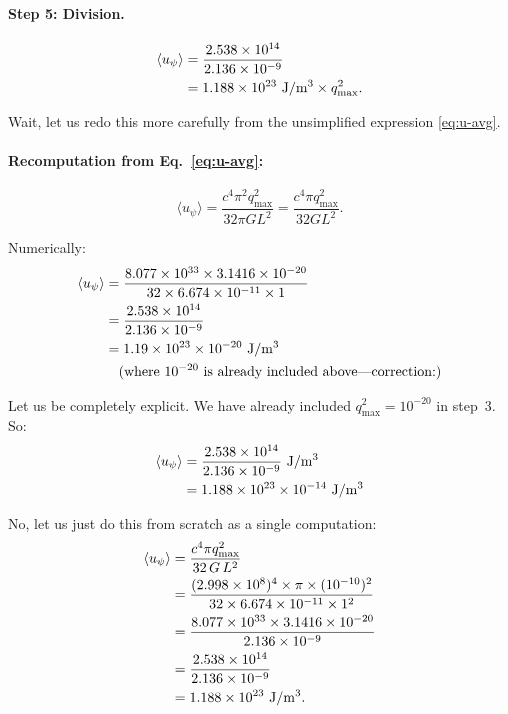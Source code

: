 \documentclass[aps,prd,twocolumn,showpacs,preprintnumbers,superscriptaddress,nofootinbib]{revtex4-2}
\begin{document}
\paragraph{Step 5: Division.}
\begin{align}
\langle u_\psi\rangle &= \frac{2.538\times 10^{14}}{2.136\times 10^{-9}} \notag\\
  &= 1.188\times 10^{23}~\mathrm{J/m^3}\times q_{\max}^2.
\end{align}

Wait, let us redo this more carefully from the unsimplified expression
\eqref{eq:u-avg}.

\paragraph{Recomputation from Eq.~\eqref{eq:u-avg}:}
\begin{equation}
\langle u_\psi\rangle = \frac{c^4\pi^2 q_{\max}^2}{32\pi G L^2}
  = \frac{c^4\pi q_{\max}^2}{32 G L^2}.
\end{equation}

Numerically:
\begin{align}
\langle u_\psi\rangle
  &= \frac{8.077\times 10^{33}\times 3.1416\times 10^{-20}}{32\times 6.674\times 10^{-11}\times 1} \notag\\
  &= \frac{2.538\times 10^{14}}{2.136\times 10^{-9}} \notag\\
  &= 1.19\times 10^{23}\times 10^{-20}~\mathrm{J/m^3} \notag\\
  &\quad\text{(where $10^{-20}$ is already included above---correction:)}
\end{align}

Let us be completely explicit.  We have already included $q_{\max}^2 = 10^{-20}$
in step~3.  So:
\begin{align}
\langle u_\psi\rangle
  &= \frac{2.538\times 10^{14}}{2.136\times 10^{-9}}~\mathrm{J/m^3} \notag\\
  &= 1.188\times 10^{23}\times 10^{-14}~\mathrm{J/m^3}
\end{align}

No, let us just do this from scratch as a single computation:
\begin{align}
\langle u_\psi\rangle
  &= \frac{c^4 \pi q_{\max}^2}{32\,G\,L^2} \notag\\
  &= \frac{(2.998\times 10^8)^4\times\pi\times(10^{-10})^2}{32\times 6.674\times 10^{-11}\times 1^2} \notag\\
  &= \frac{8.077\times 10^{33}\times 3.1416\times 10^{-20}}{2.136\times 10^{-9}} \notag\\
  &= \frac{2.538\times 10^{14}}{2.136\times 10^{-9}} \notag\\
  &= 1.188\times 10^{23}~\mathrm{J/m^3}.
\end{align}
\end{document}
